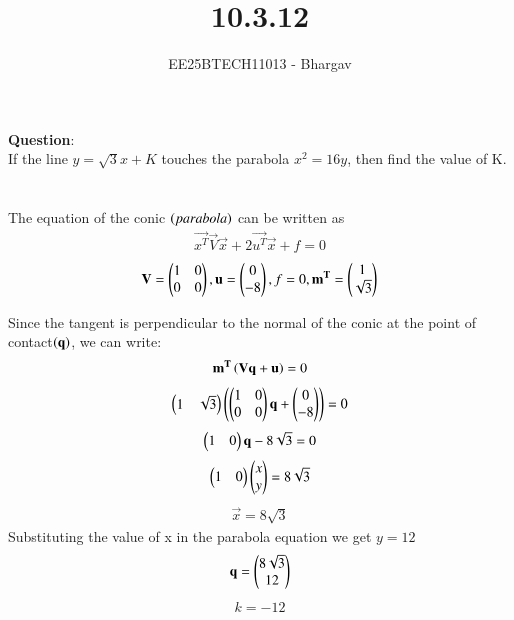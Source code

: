 \documentclass[journal]{IEEEtran}
\begin{document}

\vspace{3cm}

\title{10.3.12}
\author{EE25BTECH11013 - Bhargav}
\maketitle
    {\let\newpage\relax\maketitle}

\renewcommand{\thefigure}{\theenumi}
\renewcommand{\thetable}{\theenumi}
\setlength{\intextsep}{10pt} %

\renewcommand{\thetable}{\theenumi}

\textbf{Question}: \\
If the line $y = \sqrt{3}x + K$ touches the parabola $x^2 = 16y$, then find the value of K.\\ \\
\solution \\

The equation of the conic $\left(parabola\right)$ can be written as
\begin{align}
\vec{x^T}\vec{V}\vec{x} + 2\vec{u^T}\vec{x} + f = 0
\end{align}
\begin{align}
\mathbf{V} = \begin{pmatrix}1 & 0 \\ 0 & 0\end{pmatrix}, \mathbf{u} = \begin{pmatrix}0 \\ -8\end{pmatrix}, f=0, \mathbf{m^T} = \begin{pmatrix}1 \\ \sqrt{3}\end{pmatrix}
\end{align}

Since the tangent is perpendicular to the normal of the conic at the point of contact$\left(\mathbf{q}\right)$, we can write:
\begin{align}
\mathbf{m^T}\left(\mathbf{\mathbf{V}\mathbf{q} + \mathbf{u}}\right) = 0
\end{align}
\begin{align}
\begin{pmatrix}1 & \sqrt{3}\end{pmatrix}\left(\begin{pmatrix}1 & 0 \\ 0 & 0\end{pmatrix}\mathbf{q} + \begin{pmatrix}0 \\ -8\end{pmatrix}\right) = 0
\end{align}
\begin{align}
\begin{pmatrix}1 & 0\end{pmatrix}\mathbf{q} - 8\sqrt{3} = 0
\end{align}
\begin{align}
\begin{pmatrix}1 & 0\end{pmatrix}\begin{pmatrix}x \\ y\end{pmatrix} = 8\sqrt{3}
\end{align}
\begin{align}
\vec{x} = 8\sqrt{3}
\end{align}
Substituting the value of x in the parabola equation we get $y = 12$
\begin{align}
\mathbf{q} = \begin{pmatrix}8\sqrt{3} \\ 12\end{pmatrix}
\end{align}
\begin{align}
k = -12
\end{align}
\end{document}
